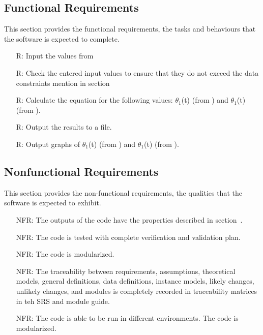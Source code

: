 \documentclass[12pt]{article}
\newcounter{reqnum} %
\begin{document}
\subsection{Functional Requirements}\label{sec_funReq}
This section provides the functional requirements, the tasks and behaviours that the software is expected to complete. \\
\noindent \begin{itemize}

\item[R\refstepcounter{reqnum}\thereqnum \label{R_Inputs}:] 
Input the values from 
\item[R\refstepcounter{reqnum}\thereqnum \label{R_VarifyInputs}:]  
Check the entered input values to ensure that they do not exceed the data constraints mention in section~
\item[R\refstepcounter{reqnum}\thereqnum \label{R_Calculate}:] Calculate the equation for the following values: $\theta_1$(t) (from ) and $\theta_1$(t) (from ).
\item[R\refstepcounter{reqnum}\thereqnum \label{R_Output}:] Output the results to a file.
\item[R\refstepcounter{reqnum}\thereqnum \label{R_Graphs}:] Output graphs of $\theta_1$(t) (from ) and $\theta_1$(t) (from ).

\end{itemize}

\subsection{Nonfunctional Requirements}\label{sec_nfr}
This section provides the non-functional requirements, the qualities that the software is expected to exhibit.


\noindent \begin{itemize}

\item[NFR\refstepcounter{reqnum}\thereqnum \label{NFR_Correct}:] 
The outputs of the code have the properties described in section~.
\item[NFR\refstepcounter{reqnum}\thereqnum \label{NFR_Verifiable}:]  
The code is tested with complete verification and validation plan.
\item[NFR\refstepcounter{reqnum}\thereqnum \label{R_Reusable}:]
The code is modularized. 
\item[NFR\refstepcounter{reqnum}\thereqnum \label{R_Maintainable}:]
The traceability between requirements, assumptions, theoretical models, general definitions, data definitions, instance models, likely changes, unlikely changes, and modules is completely recorded in traceability matrices in teh SRS and module guide. 
\item[NFR\refstepcounter{reqnum}\thereqnum \label{R_Portable}:]
The code is able to be run in different environments. 
The code is modularized.
\end{itemize}
\end{document}
